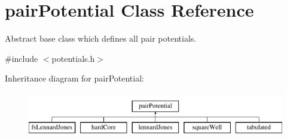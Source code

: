 \hypertarget{classpair_potential}{}\section{pair\+Potential Class Reference}
\label{classpair_potential}


Abstract base class which defines all pair potentials.  




{\ttfamily \#include $<$potentials.\+h$>$}

Inheritance diagram for pair\+Potential\+:\begin{figure}[H]
\begin{center}
\leavevmode
\includegraphics[height=2.000000cm]{classpair_potential}
\end{center}
\end{figure}
